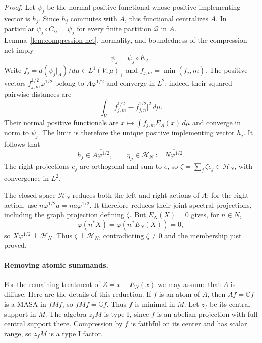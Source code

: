 \begin{proof}
Let $\psi_j$ be the normal positive functional whose positive
implementing vector is $h_j$.  Since $h_j$ commutes with $A$, this
functional centralizes $A$.  In particular
$\psi_j\circ C_{\mathcal Q}=\psi_j$ for every finite partition
$\mathcal Q$ in $A$.  Lemma~\ref{lem:compression-net}, normality, and
boundedness of the compression net imply
\[
 \psi_j=\psi_j\circ E_A.
\]
Write $f_j=d(\psi_j|_A)/d\mu\in L^1(V,\mu)_+$ and
$f_{j,m}=\min(f_j,m)$.  The positive vectors
$f_{j,m}^{1/2}\varphi^{1/2}$ belong to $A\varphi^{1/2}$ and converge in
$L^2$; indeed their squared pairwise distances are
\[
 \int_V\big|f_{j,m}^{1/2}-f_{j,n}^{1/2}\big|^2\,d\mu.
\]
Their normal positive functionals are
$x\mapsto\int f_{j,m}E_A(x)\,d\mu$ and converge in norm to $\psi_j$.
The limit is therefore the unique positive implementing vector $h_j$.
It follows that
\[
 h_j\in\overline{A\varphi^{1/2}},\qquad
 \eta_j\in\mathcal H_N:=\overline{N\varphi^{1/2}}.
\]
The right projections $e_j$ are orthogonal and sum to $e$, so
$\zeta=\sum_j\zeta e_j\in\mathcal H_N$, with convergence in $L^2$.

The closed space $\mathcal H_N$ reduces both the left and right actions
of $A$: for the right action, use
$n\varphi^{1/2}a=na\varphi^{1/2}$.  It therefore reduces their joint
spectral projections, including the graph projection defining $\zeta$.
But $E_N(X)=0$ gives, for $n\in N$,
\[
 \varphi(n^*X)=\varphi(n^*E_N(X))=0,
\]
so $X\varphi^{1/2}\perp\mathcal H_N$.  Thus
$\zeta\perp\mathcal H_N$, contradicting $\zeta\ne0$ and the
membership just proved.
\end{proof}

\paragraph{Removing atomic summands.}
For the remaining treatment of $Z=x-E_N(x)$ we may assume that $A$ is
diffuse.  Here are the details of this reduction.  If $f$ is an atom of
$A$, then $Af=\mathbb C f$ is a MASA in $fMf$, so $fMf=\mathbb C f$.
Thus $f$ is minimal in $M$.  Let $z_f$ be its central support in $M$.
The algebra $z_fM$ is type I, since $f$ is an abelian projection with
full central support there.  Compression by $f$ is faithful on its
center and has scalar range, so $z_fM$ is a type I factor.

